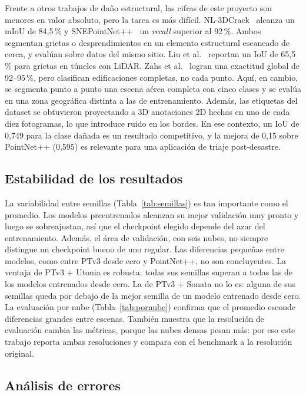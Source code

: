 \documentclass[5p]{elsarticle}
\begin{document}
Frente a otros trabajos de daño estructural, las cifras de este proyecto son menores en valor absoluto, pero la tarea es más difícil. NL-3DCrack~\cite{Lou2025} alcanza un mIoU de 84,5\,\% y SNEPointNet++~\cite{Bolourian2023} un \emph{recall} superior al 92\,\%. Ambos segmentan grietas o desprendimientos en un elemento estructural escaneado de cerca, y evalúan sobre datos del mismo sitio. Liu et al.~\cite{Liu2025} reportan un IoU de 65,5\,\% para grietas en túneles con LiDAR. Zahs et al.~\cite{Zahs2023} logran una exactitud global de 92--95\,\%, pero clasifican edificaciones completas, no cada punto. Aquí, en cambio, se segmenta punto a punto una escena aérea completa con cinco clases y se evalúa en una zona geográfica distinta a las de entrenamiento. Además, las etiquetas del dataset se obtuvieron proyectando a 3D anotaciones 2D hechas en uno de cada diez fotogramas, lo que introduce ruido en los bordes. En ese contexto, un IoU de 0,749 para la clase dañada es un resultado competitivo, y la mejora de 0,15 sobre PointNet++ (0,595) es relevante para una aplicación de triaje post-desastre.

\subsection{Estabilidad de los resultados}

La variabilidad entre semillas (Tabla~\ref{tab:semillas}) es tan importante como el promedio. Los modelos preentrenados alcanzan su mejor validación muy pronto y luego se sobreajustan, así que el checkpoint elegido depende del azar del entrenamiento. Además, el área de validación, con seis nubes, no siempre distingue un checkpoint bueno de uno regular. Las diferencias pequeñas entre modelos, como entre PTv3 desde cero y PointNet++, no son concluyentes. La ventaja de PTv3 + Utonia es robusta: todas sus semillas superan a todas las de los modelos entrenados desde cero. La de PTv3 + Sonata no lo es: alguna de sus semillas queda por debajo de la mejor semilla de un modelo entrenado desde cero. La evaluación por nube (Tabla~\ref{tab:pornube}) confirma que el promedio esconde diferencias grandes entre escenas. También muestra que la resolución de evaluación cambia las métricas, porque las nubes densas pesan más: por eso este trabajo reporta ambas resoluciones y compara con el benchmark a la resolución original.

\subsection{Análisis de errores}
\end{document}
